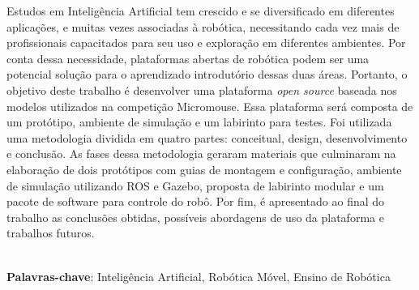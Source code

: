 \begin{thesisresumo}
Estudos em Inteligência Artificial tem crescido e se diversificado em diferentes aplicações, e muitas vezes associadas à robótica, necessitando cada vez mais de profissionais capacitados para seu uso e exploração em diferentes ambientes. Por conta dessa necessidade, plataformas abertas de robótica podem ser uma potencial solução para o aprendizado introdutório dessas duas áreas. Portanto, o objetivo deste trabalho é desenvolver uma plataforma \textit{open source} baseada nos modelos utilizados na competição Micromouse. Essa plataforma será composta de um protótipo, ambiente de simulação e um labirinto para testes. Foi utilizada uma metodologia dividida em quatro partes: conceitual, design, desenvolvimento e conclusão. As fases dessa metodologia geraram materiais que culminaram na elaboração de dois protótipos com guias de montagem e configuração, ambiente de simulação utilizando ROS e Gazebo, proposta de labirinto modular  e um pacote de software para controle do robô. Por fim, é apresentado ao final do trabalho as conclusões obtidas, possíveis abordagens de uso da plataforma e trabalhos futuros.   

\ \\


\textbf{Palavras-chave}: Inteligência Artificial, Robótica Móvel, Ensino de Robótica 

\end{thesisresumo}
